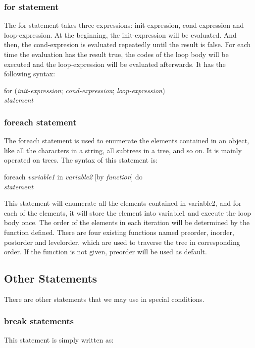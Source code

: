 \documentclass[12pt,psfig,a4]{article}
\begin{document}
\subsubsection{for statement}
The for statement takes three expressions: init-expression, cond-expression and loop-expression. At the beginning, the init-expression will be evaluated. And then, the cond-expresion is evaluated repeatedly until the result is false. For each time the evaluation has the result true, the codes of the loop body will be executed and the loop-expression will be evaluated afterwards. It has the following syntax:

\begin{code}
for (\textit{init-expression}; \textit{cond-expression}; \textit{loop-expression}) \\
\textit{statement}
\end{code}

\subsubsection{foreach statement}
The foreach statement is used to enumerate the elements contained in an object, like all the characters in a string, all subtrees in a tree, and so on. It is mainly operated on trees. The syntax of this statement is:

\begin{code}
foreach \textit{variable1} in \textit{variable2} [by \textit{function}] do \\
\textit{statement}
\end{code}

\noindent
This statement will enumerate all the elements contained in variable2, and for each of the elements, it will store the element into variable1 and execute the loop body once. The order of the elements in each iteration will be determined by the function defined. There are four existing functions named preorder, inorder, postorder and levelorder, which are used to traverse the tree in corresponding order. If the function is not given, preorder will be used as default.

\subsection{Other Statements}
There are other statements that we may use in special conditions.

\subsubsection{break statements}
This statement is simply written as:
\end{document}
